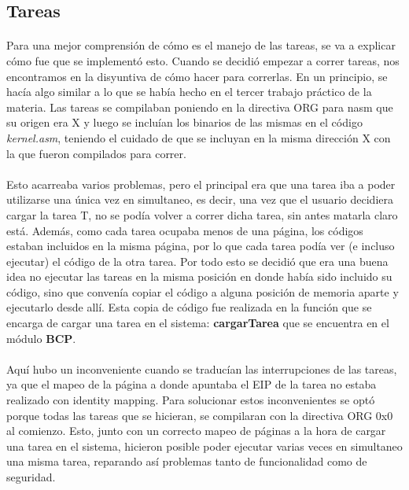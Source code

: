 \documentclass[11pt, a4paper]{article}
\begin{document}
\subsection{Tareas}

\paragraph{}
Para una mejor comprensión de cómo es el manejo de las tareas, se va a explicar cómo fue que se implementó esto. Cuando se decidió empezar a correr tareas, nos encontramos en la disyuntiva de cómo hacer para correrlas. En un principio, se hacía algo similar a lo que se había hecho en el tercer trabajo práctico de la materia. Las tareas se compilaban poniendo en la directiva ORG para nasm que su origen era X y luego se incluían los binarios de las mismas en el código \textit{kernel.asm}, teniendo el cuidado de que se incluyan en la misma dirección X con la que fueron compilados para correr.

\paragraph{}
Esto acarreaba varios problemas, pero el principal era que una tarea iba a poder utilizarse una única vez en simultaneo, es decir, una vez que el usuario decidiera cargar la tarea T, no se podía volver a correr dicha tarea, sin antes matarla claro está. Además, como cada tarea ocupaba menos de una página, los códigos estaban incluidos en la misma página, por lo que cada tarea podía ver (e incluso ejecutar) el código de la otra tarea. Por todo esto se decidió que era una buena idea no ejecutar las tareas en la misma posición en donde había sido incluido su código, sino que convenía copiar el código a alguna posición de memoria aparte y ejecutarlo desde allí. Esta copia de código fue realizada en la función que se encarga de cargar una tarea en el sistema: \textbf{cargarTarea} que se encuentra en el módulo \textbf{BCP}.

\paragraph{}
Aquí hubo un inconveniente cuando se traducían las interrupciones de las tareas, ya que el mapeo de la página a donde apuntaba el EIP de la tarea no estaba realizado con identity mapping. Para solucionar estos inconvenientes se optó porque todas las tareas que se hicieran, se compilaran con la directiva ORG 0x0 al comienzo. Esto, junto con un correcto mapeo de páginas a la hora de cargar una tarea en el sistema, hicieron posible poder ejecutar varias veces en simultaneo una misma tarea, reparando así problemas tanto de funcionalidad como de seguridad.
\end{document}
